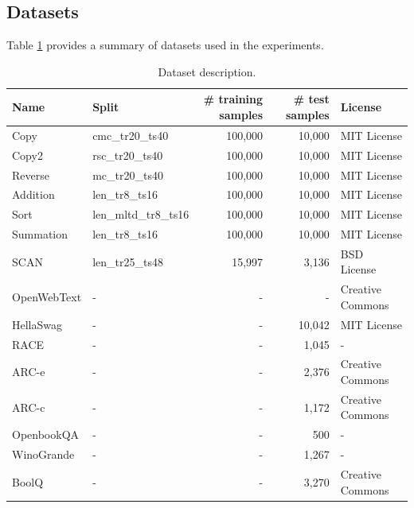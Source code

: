 \documentclass[11pt]{article}
\begin{document}
\subsection{Datasets}\label{subsec:datasets}
Table \ref{tab:datasets} provides a summary of datasets used in the experiments.

\begin{table}
  \centering
  \begin{tabular}{llrrl}
    \toprule
    \textbf{Name} & \textbf{Split} &  \textbf{\# training samples} & \textbf{\# test samples} & \textbf{License} \\
    \midrule
    Copy & cmc\_tr20\_ts40 & 100,000 & 10,000 & MIT License \\
    Copy2 & rsc\_tr20\_ts40 & 100,000 & 10,000 & MIT License \\
    Reverse & mc\_tr20\_ts40 & 100,000 & 10,000 & MIT License \\
    Addition & len\_tr8\_ts16 & 100,000 & 10,000 & MIT License \\
    Sort & len\_mltd\_tr8\_ts16 & 100,000 & 10,000 & MIT License \\
    Summation & len\_tr8\_ts16 & 100,000 & 10,000 & MIT License \\
    SCAN & len\_tr25\_ts48 & 15,997 & 3,136 & BSD License \\
    OpenWebText & - & - & - & Creative Commons \\
    HellaSwag & - & - & 10,042 & MIT License \\
    RACE & - & - & 1,045 & - \\
    ARC-e & - & - & 2,376 & Creative Commons \\
    ARC-c & - & - & 1,172 & Creative Commons \\
    OpenbookQA & - & - & 500 & - \\
    WinoGrande & - & - & 1,267 & - \\
    BoolQ & - & - & 3,270 & Creative Commons \\
    \bottomrule
  \end{tabular}
  \caption{Dataset description.}
  \label{tab:datasets}
\end{table}
\end{document}
